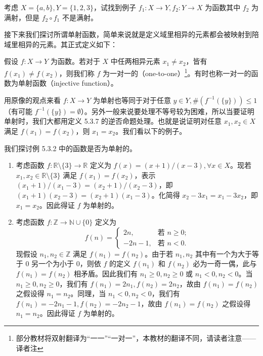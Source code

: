 \begin{question}
考虑 $X = \{a, b\}, Y = \{1, 2, 3\}$，试找到例子 $f_1 : X \to Y, f_2 : Y \to X$ 为函数其中 $f_2$ 为满射，但是 $f_2 \circ f_1$ 不是满射。
\end{question}

接下来我们探讨所谓单射函数，简单来说就是定义域里相异的元素都会被映射到陪域里相异的元素。其正式定义如下：

\begin{definition}
假设 $f : X \to Y$ 为函数。若对于 $X$ 中任两相异元素 $x_1 \neq x_2$，皆有 $f(x_1) \neq f(x_2)$，则我们称 $f$ 为一对一的（one-to-one）\footnote{部分教材将双射翻译为“一一”“一对一”，本教材的翻译不同，请读者注意——译者注}。有时也称一对一的函数为单射函数（injective function）。
\end{definition}

用原像的观点来看 $f : X \to Y$ 为单射也等同于对于任意 $y \in Y, \#(f^{-1}(\{y\})) \leq 1$（有可能 $f^{-1}(\{y\}) = \emptyset$）。另外一般来说要处理不等号较为困难，所以当要证明单射时，我们大都用定义 5.3.7 的逆否命题处理。也就是说证明对任意 $x_1, x_2 \in X$ 满足 $f(x_1) = f(x_2)$，则 $x_1 = x_2$。我们看以下的例子。

\begin{example}
我们探讨例 5.3.2 中的函数是否为单射的。
\begin{enumerate}
    \item 考虑函数 $f : \mathbb{R} \setminus \{3\} \to \mathbb{R}$ 定义为 $f(x) = (x + 1)/(x - 3), \forall x \in X$。现若 $x_1, x_2 \in \mathbb{R} \setminus \{3\}$ 满足 $f(x_1) = f(x_2)$，表示 $(x_1 + 1)/(x_1 - 3) = (x_2 + 1)/(x_2 - 3)$，即 $(x_1 + 1)(x_2 - 3) = (x_2 + 1)(x_1 - 3)$。化简得 $x_2 - 3x_1 = x_1 - 3x_2$，即 $x_1 = x_2$。因此得证 $f$ 为单射的。
    \item 考虑函数 $f : \mathbb{Z} \to \mathbb{N} \cup \{0\}$ 定义为
    $$ f(n) = \begin{cases} 2n, & \text{若 } n \geq 0; \\ -2n - 1, & \text{若 } n < 0. \end{cases} $$
    现假设 $n_1, n_2 \in \mathbb{Z}$ 满足 $f(n_1) = f(n_2)$。由于若 $n_1, n_2$ 其中有一个为大于等于 0 另一个为小于 0，则依 $f$ 的定义 $f(n_1)$ 和 $f(n_2)$ 必为一奇一偶，此与 $f(n_1) = f(n_2)$ 相矛盾。因此我们有 $n_1 \geq 0, n_2 \geq 0$ 或 $n_1 < 0, n_2 < 0$。当 $n_1 \geq 0, n_2 \geq 0$，我们有 $f(n_1) = 2n_1, f(n_2) = 2n_2$，故由 $f(n_1) = f(n_2)$ 之假设得 $n_1 = n_2$。同理，当 $n_1 < 0, n_2 < 0$，我们有 $f(n_1) = -2n_1 - 1, f(n_2) = -2n_2 - 1$，故由 $f(n_1) = f(n_2)$ 之假设得 $n_1 = n_2$。因此得证 $f$ 为单射的。
\end{enumerate}
\end{example}

